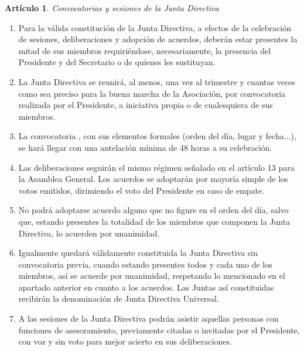 \documentclass[a4paper,12pt]{article}
\theoremstyle{mystyle}		%
\newtheorem{art}{Artículo}	%
\begin{document}
\begin{onehalfspace}
\begin{art}
Convocatorias y sesiones de la Junta Directiva
\end{art}
\begin{enumerate}[label={\arabic*.-}]
 \item Para la válida constitución de la Junta Directiva, a efectos de la celebración de sesiones, deliberaciones y adopción de acuerdos, deberán estar presentes la mitad de sus miembros requiriéndose, necesariamente, la presencia del Presidente y del Secretario o de quienes les sustituyan.
 \item La Junta Directiva se reunirá, al menos, una vez al trimestre y cuantas veces como sea preciso para la buena marcha de la Asociación, por convocatoria realizada por el Presidente, a iniciativa propia o de cualesquiera de sus miembros.
 \item La convocatoria , con sus elementos formales (orden del día, lugar y fecha...), se hará llegar con una antelación mínima de 48 horas a su celebración.
 \item Las deliberaciones seguirán el mismo régimen señalado en el artículo 13 para la Asamblea General. Los acuerdos se adoptarán por mayoría simple de los votos emitidos, dirimiendo el voto del Presidente en caso de empate.
 \item No podrá adoptarse acuerdo alguno que no figure en el orden del día, salvo que, estando presentes la totalidad de los miembros que componen la Junta Directiva, lo acuerden por unanimidad.
 \item Igualmente quedará válidamente constituida la Junta Directiva sin convocatoria previa, cuando estando presentes todos y cada uno de los miembros, así se acuerde por unanimidad, respetando lo mencionado en el apartado anterior en cuanto a los acuerdos. Las Juntas así constituidas recibirán la denominación de Junta Directiva Universal.
 \item A las sesiones de la Junta Directiva podrán asistir aquellas personas con funciones de asesoramiento, previamente citadas o invitadas por el Presidente, con voz y sin voto para mejor acierto en sus deliberaciones.
\end{enumerate}


\end{onehalfspace}
\end{document}
